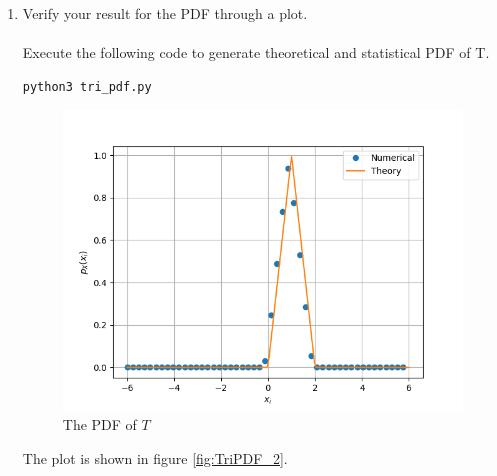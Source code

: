 \documentclass[journal,12pt,twocolumn]{IEEEtran}
\renewcommand\thesection{\arabic{section}}
\begin{document}
\begin{enumerate}[label=\thesection.\arabic*
,ref=\thesection.\theenumi]
\item
	Verify your result for the PDF through a plot.
	\\
	\solution
	\\
	Execute the following code to generate theoretical and statistical PDF of T.
	\begin{lstlisting}
python3 tri_pdf.py
	\end{lstlisting}
	\begin{figure}
	\centering
	\includegraphics[width=\columnwidth]{../figs/tri_pdf_comp.png}
	\caption{The PDF of $T$}
	\label{fig:TriPDF_2}
	\end{figure}
	
	The plot is shown in figure \eqref{fig:TriPDF_2}.


\end{enumerate}
\end{document}
